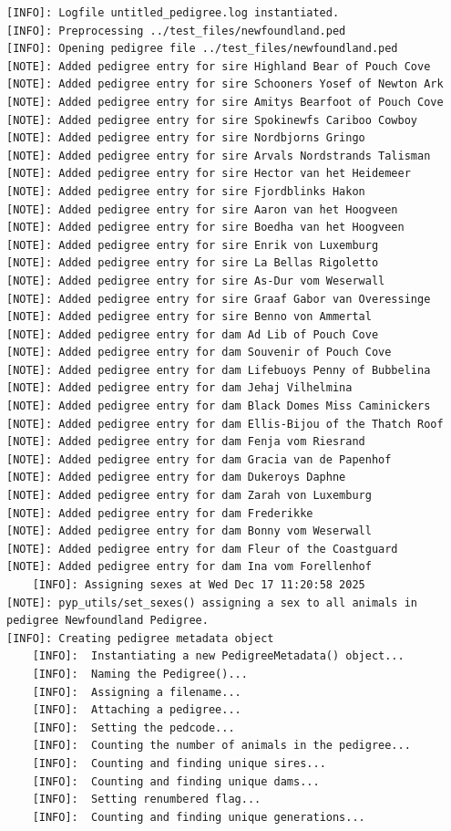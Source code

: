 \documentclass[
  letterpaper,
  DIV=11,
  numbers=noendperiod]{scrreprt}
\begin{document}
\begin{codelisting}
{\begin{verbatim}
[INFO]: Logfile untitled_pedigree.log instantiated.
[INFO]: Preprocessing ../test_files/newfoundland.ped
[INFO]: Opening pedigree file ../test_files/newfoundland.ped
[NOTE]: Added pedigree entry for sire Highland Bear of Pouch Cove
[NOTE]: Added pedigree entry for sire Schooners Yosef of Newton Ark
[NOTE]: Added pedigree entry for sire Amitys Bearfoot of Pouch Cove
[NOTE]: Added pedigree entry for sire Spokinewfs Cariboo Cowboy
[NOTE]: Added pedigree entry for sire Nordbjorns Gringo
[NOTE]: Added pedigree entry for sire Arvals Nordstrands Talisman
[NOTE]: Added pedigree entry for sire Hector van het Heidemeer
[NOTE]: Added pedigree entry for sire Fjordblinks Hakon
[NOTE]: Added pedigree entry for sire Aaron van het Hoogveen
[NOTE]: Added pedigree entry for sire Boedha van het Hoogveen
[NOTE]: Added pedigree entry for sire Enrik von Luxemburg
[NOTE]: Added pedigree entry for sire La Bellas Rigoletto
[NOTE]: Added pedigree entry for sire As-Dur vom Weserwall
[NOTE]: Added pedigree entry for sire Graaf Gabor van Overessinge
[NOTE]: Added pedigree entry for sire Benno von Ammertal
[NOTE]: Added pedigree entry for dam Ad Lib of Pouch Cove
[NOTE]: Added pedigree entry for dam Souvenir of Pouch Cove
[NOTE]: Added pedigree entry for dam Lifebuoys Penny of Bubbelina
[NOTE]: Added pedigree entry for dam Jehaj Vilhelmina
[NOTE]: Added pedigree entry for dam Black Domes Miss Caminickers
[NOTE]: Added pedigree entry for dam Ellis-Bijou of the Thatch Roof
[NOTE]: Added pedigree entry for dam Fenja vom Riesrand
[NOTE]: Added pedigree entry for dam Gracia van de Papenhof
[NOTE]: Added pedigree entry for dam Dukeroys Daphne
[NOTE]: Added pedigree entry for dam Zarah von Luxemburg
[NOTE]: Added pedigree entry for dam Frederikke
[NOTE]: Added pedigree entry for dam Bonny vom Weserwall
[NOTE]: Added pedigree entry for dam Fleur of the Coastguard
[NOTE]: Added pedigree entry for dam Ina vom Forellenhof
    [INFO]: Assigning sexes at Wed Dec 17 11:20:58 2025
[NOTE]: pyp_utils/set_sexes() assigning a sex to all animals in pedigree Newfoundland Pedigree.
[INFO]: Creating pedigree metadata object
    [INFO]:  Instantiating a new PedigreeMetadata() object...
    [INFO]:  Naming the Pedigree()...
    [INFO]:  Assigning a filename...
    [INFO]:  Attaching a pedigree...
    [INFO]:  Setting the pedcode...
    [INFO]:  Counting the number of animals in the pedigree...
    [INFO]:  Counting and finding unique sires...
    [INFO]:  Counting and finding unique dams...
    [INFO]:  Setting renumbered flag...
    [INFO]:  Counting and finding unique generations...

\end{verbatim}}
\end{codelisting}
\end{document}
